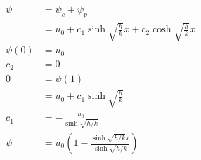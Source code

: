 \documentclass{article}
\begin{document}
\begin{align*}
  \psi                                        & = \psi_c + \psi_p                                                        \\
                                              & = u_0 + c_1 \sinh \sqrt{\frac{h}{k}} x + c_2 \cosh \sqrt{\frac{h}{k}} x  \\
  \psi(0)                                     & = u_0                                                                    \\
  c_2                                         & = 0                                                                      \\
  0                                           & = \psi(1)                                                                \\
                                              & = u_0 + c_1 \sinh \sqrt{\frac{h}{k}}                                     \\
  c_1                                         & = -\frac{u_0}{\sinh \sqrt{h / k}}                                        \\
  \psi                                        & = u_0 \left( 1 - \frac{\sinh \sqrt{h / k} x}{\sinh \sqrt{h / k}} \right)
\end{align*}

\setcounter{subsubsection}{12}
\subsubsection{}
\end{document}
